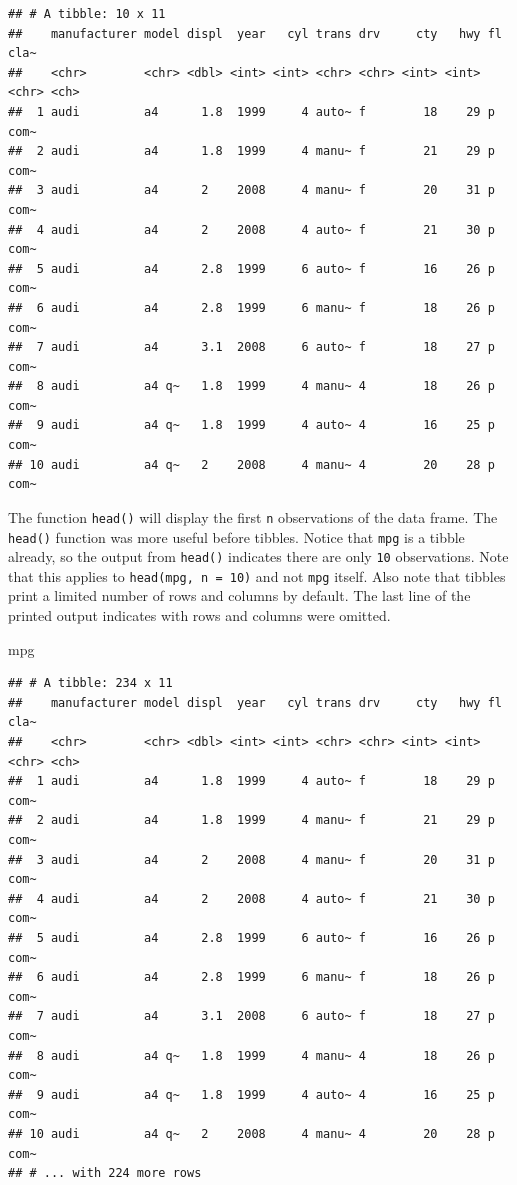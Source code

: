 \documentclass[]{book}
\newenvironment{Shaded}{\begin{snugshade}}{\end{snugshade}}
\newcommand{\NormalTok}[1]{#1}
\theoremstyle{definition}
\theoremstyle{definition}
\theoremstyle{definition}
\theoremstyle{remark}
\begin{document}
\begin{verbatim}
## # A tibble: 10 x 11
##    manufacturer model displ  year   cyl trans drv     cty   hwy fl    cla~
##    <chr>        <chr> <dbl> <int> <int> <chr> <chr> <int> <int> <chr> <ch>
##  1 audi         a4      1.8  1999     4 auto~ f        18    29 p     com~
##  2 audi         a4      1.8  1999     4 manu~ f        21    29 p     com~
##  3 audi         a4      2    2008     4 manu~ f        20    31 p     com~
##  4 audi         a4      2    2008     4 auto~ f        21    30 p     com~
##  5 audi         a4      2.8  1999     6 auto~ f        16    26 p     com~
##  6 audi         a4      2.8  1999     6 manu~ f        18    26 p     com~
##  7 audi         a4      3.1  2008     6 auto~ f        18    27 p     com~
##  8 audi         a4 q~   1.8  1999     4 manu~ 4        18    26 p     com~
##  9 audi         a4 q~   1.8  1999     4 auto~ 4        16    25 p     com~
## 10 audi         a4 q~   2    2008     4 manu~ 4        20    28 p     com~
\end{verbatim}

The function \texttt{head()} will display the first \texttt{n}
observations of the data frame. The \texttt{head()} function was more
useful before tibbles. Notice that \texttt{mpg} is a tibble already, so
the output from \texttt{head()} indicates there are only \texttt{10}
observations. Note that this applies to \texttt{head(mpg,\ n\ =\ 10)}
and not \texttt{mpg} itself. Also note that tibbles print a limited
number of rows and columns by default. The last line of the printed
output indicates with rows and columns were omitted.

\begin{Shaded}
\begin{Highlighting}[]
\NormalTok{mpg}
\end{Highlighting}
\end{Shaded}

\begin{verbatim}
## # A tibble: 234 x 11
##    manufacturer model displ  year   cyl trans drv     cty   hwy fl    cla~
##    <chr>        <chr> <dbl> <int> <int> <chr> <chr> <int> <int> <chr> <ch>
##  1 audi         a4      1.8  1999     4 auto~ f        18    29 p     com~
##  2 audi         a4      1.8  1999     4 manu~ f        21    29 p     com~
##  3 audi         a4      2    2008     4 manu~ f        20    31 p     com~
##  4 audi         a4      2    2008     4 auto~ f        21    30 p     com~
##  5 audi         a4      2.8  1999     6 auto~ f        16    26 p     com~
##  6 audi         a4      2.8  1999     6 manu~ f        18    26 p     com~
##  7 audi         a4      3.1  2008     6 auto~ f        18    27 p     com~
##  8 audi         a4 q~   1.8  1999     4 manu~ 4        18    26 p     com~
##  9 audi         a4 q~   1.8  1999     4 auto~ 4        16    25 p     com~
## 10 audi         a4 q~   2    2008     4 manu~ 4        20    28 p     com~
## # ... with 224 more rows
\end{verbatim}
\end{document}
